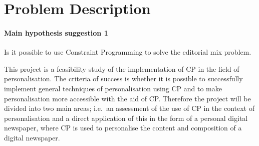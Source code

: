 \section{Problem Description}

\paragraph{Main hypothesis suggestion 1}
\label{sec:hypothesis}
Is it possible to use Constraint Programming to solve the editorial mix problem.


This project is a feasibility study of the implementation of CP in the field of personalisation. The criteria of success is whether it is possible to successfully implement general techniques of personalisation using CP and to make personalisation more accessible with the aid of CP.
Therefore the project will be divided into two main areas; i.e.\ an assessment of the use of CP in the context of personalisation and a direct application of this in the form of a personal digital newspaper, where CP is used to personalise the content and composition of a digital newspaper.

